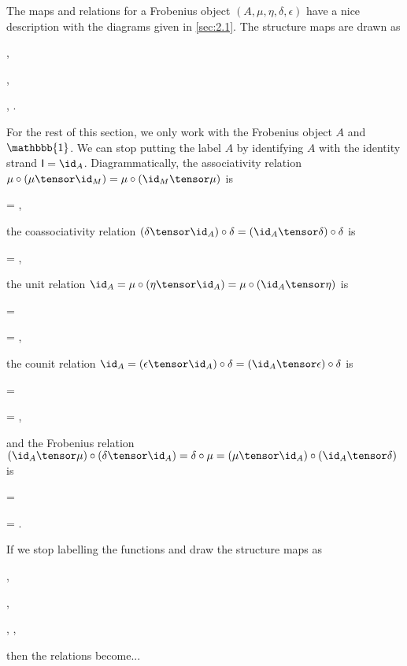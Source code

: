 The maps and relations for a Frobenius object $(A,\mu,\eta,\delta,\epsilon)$ have a nice description with the diagrams given in \autoref{sec:2.1}. The structure maps are drawn as
\begin{center}
    
    \quad , \quad
    
    \quad , \quad
    
    \quad , \quad
    .
\end{center}

For the rest of this section, we only work with the Frobenius object $A$ and $\mathbbb{1}$. We can stop putting the label $A$ by identifying $A$ with the identity strand $\mathsf{I} = \id_A$. Diagrammatically, the associativity relation $\mu \circ (\mu \tensor \id_M) = \mu \circ (\id_M \tensor \mu)$ is
\begin{center}
    
    =
    ,
\end{center}
the coassociativity relation $(\delta \tensor \id_A) \circ \delta = (\id_A \tensor \delta) \circ \delta$ is
\begin{center}
    
    =
    ,
\end{center}
the unit relation $\id_A = \mu \circ (\eta \tensor \id_A) = \mu \circ (\id_A \tensor \eta)$ is
\begin{center}
    
    =
    
    =
    ,
\end{center}
the counit relation $\id_A = (\epsilon \tensor \id_A) \circ \delta = (\id_A \tensor \epsilon) \circ \delta$ is
\begin{center}
    
    =
    
    =
    ,
\end{center}
and the Frobenius relation $(\id_A \tensor \mu) \circ (\delta \tensor \id_A) = \delta \circ \mu = (\mu \tensor \id_A) \circ (\id_A \tensor \delta)$ is
\begin{center}
    
    =
    
    =
    .
\end{center}


If we stop labelling the functions and draw the structure maps as
\begin{center}
    
    \quad , \quad
    
    \quad , \quad
    
    \quad , \quad
    ,
\end{center}
then the relations become...









